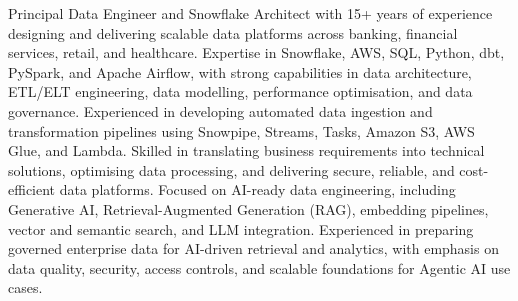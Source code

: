 
\begin{cvparagraph}

Principal Data Engineer and Snowflake Architect with 15+ years of experience designing and delivering scalable data platforms across banking, financial services, retail, and healthcare. Expertise in Snowflake, AWS, SQL, Python, dbt, PySpark, and Apache Airflow, with strong capabilities in data architecture, ETL/ELT engineering, data modelling, performance optimisation, and data governance.
Experienced in developing automated data ingestion and transformation pipelines using Snowpipe, Streams, Tasks, Amazon S3, AWS Glue, and Lambda. Skilled in translating business requirements into technical solutions, optimising data processing, and delivering secure, reliable, and cost-efficient data platforms.
Focused on AI-ready data engineering, including Generative AI, Retrieval-Augmented Generation (RAG), embedding pipelines, vector and semantic search, and LLM integration. Experienced in preparing governed enterprise data for AI-driven retrieval and analytics, with emphasis on data quality, security, access controls, and scalable foundations for Agentic AI use cases.

\end{cvparagraph}
